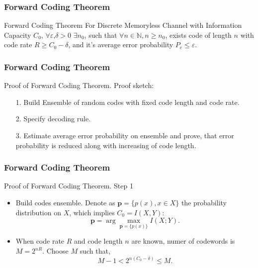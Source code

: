 \documentclass[14pt]{beamer}
\renewcommand{\vec}[1]{\ensuremath{\boldsymbol{#1}}}
\begin{document}
\begin{frame}
\frametitle{Forward Coding Theorem}
\begin{itemize}

\begin{theorem} {Forward Coding Theorem} For Discrete Memoryless Channel with Information Capacity $C_0 $, $\forall \varepsilon $,$\delta > 0$ $\exists n_0 $, such that $\forall n \in \mathbb{N}, n \ge n_0 $, exists code of length $n$ with code rate $R \ge C_0 - \delta $, and it's average error probability $P_e \le \varepsilon $.
\end{theorem}


\end{itemize}
\end{frame}


\begin{frame}
\frametitle{Forward Coding Theorem}
Proof of Forward Coding Theorem. Proof sketch: 
\begin{itemize}

    \item[1.]Build Ensemble of random codes with fixed code length and code rate.
    \item[2.] Specify decoding rule.
    \item[3.] Estimate average error probability on ensemble and prove, that error probability is reduced along with increasing of code length.

\end{itemize}
\end{frame}


\begin{frame}
\frametitle{Forward Coding Theorem}
Proof of Forward Coding Theorem. Step 1
\begin{itemize}

    \item Build codes ensemble. Denote as ${\vec p} = \{p(x),x \in X\}$ the probability distribution on $X$, which implies $C_0 = I(X,Y)$:
    \[
    {\vec p} = \arg \mathop {\max }\limits_{\vec p = \{p(x)\}} I(X;Y).
    \]
    
    \item When code rate $R$ and code length $n$ are known, numer of codewords is $M = 2^{nR}$. Choose $M$ such that,
    \begin{equation}
    \label{eq5_44} M - 1 < 2^{n(C_0 - \delta )} \le M.
    \end{equation}

\end{itemize}
\end{frame}
\end{document}
